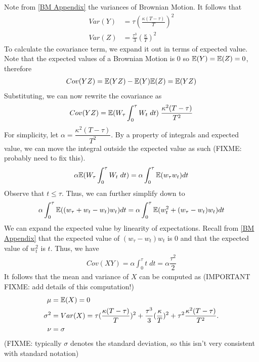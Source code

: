 \documentclass[reqno]{amsart}
\begin{document}
Note from \eqref{BM Appendix} the variances of Brownian Motion. It follows that 
\begin{align}
     Var(Y) &= \tau \left(\frac{\kappa(T-\tau)}{T} \right)^2\\
     Var(Z) &= \frac{\tau^3}{3} \left(\frac{\kappa}{T}\right)^2
\end{align}
To calculate the covariance term, we expand it out in terms of expected value.
Note that the expected values of a Brownian Motion is $0$ so $\mathbb{E}(Y) = \mathbb{E}(Z) = 0$, therefore
\begin{align}
     Cov(YZ) = \mathbb{E}(YZ) - \mathbb{E}(Y)\mathbb{E}(Z) = \mathbb{E}(YZ)
\end{align}
Substituting, we can now rewrite the covariance as
\begin{align}
     Cov(YZ) = \mathbb{E}(W_\tau \int_0^\tau W_t \; dt) \;\dfrac{\kappa^2 (T - \tau)}{T^2}
\end{align}
For simplicity, let $\alpha = \dfrac{\kappa^2 (T - \tau)}{T^2}$.
By a property of integrals and expected value, we can move the integral outside the expected value as such (FIXME:  probably need to fix this).
\begin{align}
     \alpha \mathbb{E}(W_\tau \int_0^\tau W_t \; dt) = \alpha \int_0^\tau \mathbb{E}(w_\tau w_t) dt
\end{align}
Observe that $t \leq \tau$. Thus, we can further simplify down to
\begin{align}
     \alpha \int_0^\tau \mathbb{E}((w_\tau + w_t - w_t) w_t) dt = \alpha \int_0^\tau \mathbb{E}(w_t^2 + (w_\tau - w_t) w_t) dt
\end{align}
We can expand the expected value by linearity of expectations. 
Recall from \eqref{BM Appendix} that the expected value of $(w_\tau - w_t) w_t$ is $0$ and that the expected value of $w_t^2$ is $t$. Thus, we have
\begin{align}
     Cov(XY) = \alpha \int_0^\tau t \; dt = \alpha \dfrac{\tau^2}{2}
\end{align}
It follows that the mean and variance of $X$ can be computed as (IMPORTANT FIXME: add details of this computation!)
\begin{align}
     \mu &= \mathbb{E}(X) = 0\\
     \sigma^2 &= Var(X) = \tau(\frac{\kappa(T-\tau)}{T})^2 + \frac{\tau^3}{3}(\frac{\kappa}{T})^2 + \tau^2\frac{\kappa^2(T-\tau)}{T^2}.\\
     \nu &= \sigma
\end{align}
(FIXME: typically $\sigma$ denotes the standard deviation, so this isn't very consistent with standard notation)
\end{document}
